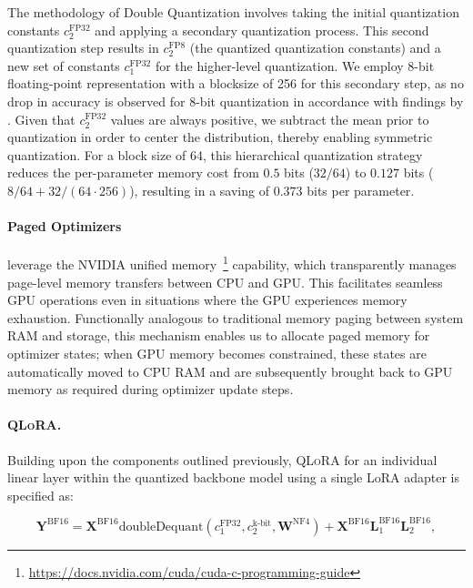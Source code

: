 The methodology of Double Quantization involves taking the initial quantization constants $c_2^{\text{FP32}}$ and applying a secondary quantization process. This second quantization step results in $c_2^{\text{FP8}}$ (the quantized quantization constants) and a new set of constants $c_1^{\text{FP32}}$ for the higher-level quantization. We employ 8-bit floating-point representation with a blocksize of 256 for this secondary step, as no drop in accuracy is observed for 8-bit quantization in accordance with findings by \citet{dettmers2022case}. Given that $c_2^{\text{FP32}}$ values are always positive, we subtract the mean prior to quantization in order to center the distribution, thereby enabling symmetric quantization. For a block size of 64, this hierarchical quantization strategy reduces the per-parameter memory cost from $0.5$ bits ($32/64$) to $0.127$ bits ($8/64 + 32/(64\cdot256)$), resulting in a saving of $0.373$ bits per parameter.

\paragraph{Paged Optimizers} leverage the NVIDIA unified memory~\footnote{\tiny \url{https://docs.nvidia.com/cuda/cuda-c-programming-guide}} capability, which transparently manages page-level memory transfers between CPU and GPU. This facilitates seamless GPU operations even in situations where the GPU experiences memory exhaustion. Functionally analogous to traditional memory paging between system RAM and storage, this mechanism enables us to allocate paged memory for optimizer states; when GPU memory becomes constrained, these states are automatically moved to CPU RAM and are subsequently brought back to GPU memory as required during optimizer update steps.

\paragraph{\textsc{QLoRA}.} Building upon the components outlined previously, \textsc{QLoRA} for an individual linear layer within the quantized backbone model using a single LoRA adapter is specified as:

\begin{equation}
    \mathbf{Y}^{\text{BF16}} =  \mathbf{X}^{\text{BF16}} \text{doubleDequant}(c_1^{\text{FP32}}, c_2^{\text{k-bit}}, \mathbf{W}^{\text{NF4}}) + \mathbf{X}^{\text{BF16}}\mathbf{L}^{\text{BF16}}_1\mathbf{L}^{\text{BF16}}_2,
\end{equation}

